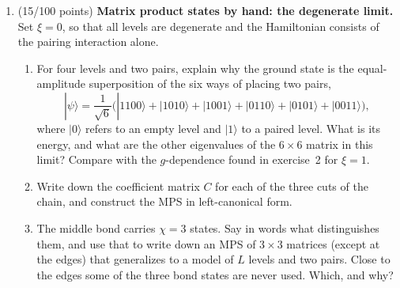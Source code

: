 \documentclass[prc]{revtex4} \usepackage[dvips]{graphicx}
\begin{document}
\begin{enumerate}
\item (15/100 points) \textbf{Matrix product states by hand: the degenerate limit.}
Set $\xi=0$, so that all levels are degenerate and the Hamiltonian
consists of the pairing interaction alone.
\begin{enumerate}
\item For four levels and two pairs, explain why the ground state is
  the equal-amplitude superposition of the six ways of placing two
  pairs,
\[
|\psi\rangle=\frac{1}{\sqrt{6}}\Big(|1100\rangle+|1010\rangle+|1001\rangle
+|0110\rangle+|0101\rangle+|0011\rangle\Big),
\]
  where $|0\rangle$ refers to an empty level and $|1\rangle$ to a
  paired level. What is its energy, and what are the other eigenvalues
  of the $6\times 6$ matrix in this limit? Compare with the
  $g$-dependence found in exercise~2 for $\xi=1$.
\item Write down the coefficient matrix $C$ for each of the three cuts
  of the chain, and construct the MPS in left-canonical form.
\item The middle bond carries $\chi=3$ states. Say in words what
  distinguishes them, and use that to write down an MPS of $3\times 3$
  matrices (except at the edges) that generalizes to a model of $L$
  levels and two pairs. Close to the edges some of the three bond
  states are never used. Which, and why?

\end{enumerate}


\end{enumerate}
\end{document}
